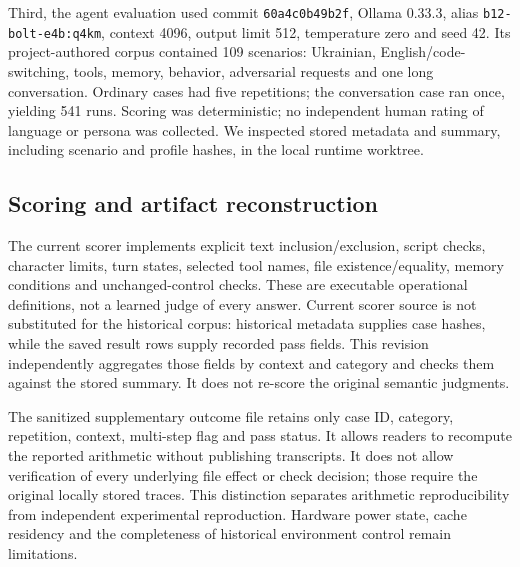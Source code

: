 \documentclass[11pt,a4paper]{article}
\begin{document}
Third, the agent evaluation used commit \texttt{60a4c0b49b2f}, Ollama 0.33.3, alias \texttt{b12-bolt-e4b:q4km}, context 4096, output limit 512, temperature zero and seed 42. Its project-authored corpus contained 109 scenarios: Ukrainian, English/code-switching, tools, memory, behavior, adversarial requests and one long conversation. Ordinary cases had five repetitions; the conversation case ran once, yielding 541 runs. Scoring was deterministic; no independent human rating of language or persona was collected. We inspected stored metadata and summary, including scenario and profile hashes, in the local runtime worktree.


\subsection{Scoring and artifact reconstruction}
The current scorer implements explicit text inclusion/exclusion, script checks, character limits, turn states, selected tool names, file existence/equality, memory conditions and unchanged-control checks. These are executable operational definitions, not a learned judge of every answer. Current scorer source is not substituted for the historical corpus: historical metadata supplies case hashes, while the saved result rows supply recorded pass fields. This revision independently aggregates those fields by context and category and checks them against the stored summary. It does not re-score the original semantic judgments.

The sanitized supplementary outcome file retains only case ID, category, repetition, context, multi-step flag and pass status. It allows readers to recompute the reported arithmetic without publishing transcripts. It does not allow verification of every underlying file effect or check decision; those require the original locally stored traces. This distinction separates arithmetic reproducibility from independent experimental reproduction. Hardware power state, cache residency and the completeness of historical environment control remain limitations.
\end{document}
